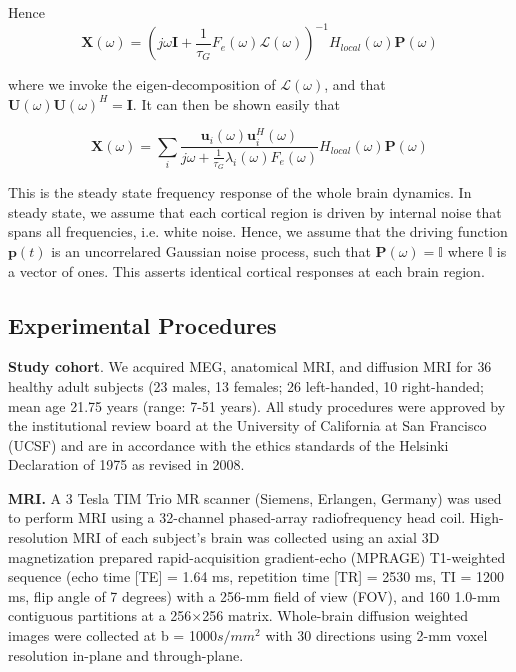Hence
\begin{equation}
\label{eq:lap_sgm}
\mathbf{X}(\omega) = (j\omega\mathbf{I} + \frac{1}{\tau_{G}} F_{e}(\omega) \mathcal{L}(\omega))^{-1} H_{local}(\omega)\mathbf{P}(\omega)
\end{equation}

where we invoke the eigen-decomposition of $\mathcal{L}(\omega)$, and
that $\mathbf{U}(\omega){\mathbf{U}(\omega)}^{H} = \mathbf{I}$. It
can then be shown easily that

\begin{equation}
\label{sgm}
\mathbf{X}(\omega) =\sum_{i}\frac{\mathbf{u}_{i}(\omega)\mathbf{u}_{i}^{H}(\omega)}{j\omega + \frac{1}{\tau_{G}}\lambda_{i}(\omega) F_{e}(\omega)} H_{local}(\omega) \mathbf{P}(\omega)
\end{equation}

This is the steady state frequency response of the whole brain dynamics.
In steady state, we assume that each cortical region is driven by
internal noise that spans all frequencies, i.e. white noise. Hence, we
assume that the driving function $\mathbf{p}(t)$ is an uncorrelared
Gaussian noise process, such that
$\mathbf{P}(\omega) = \mathbb{I}$ where $\mathbb{l}$ is a vector of
ones. This asserts identical cortical responses at each brain region.

\subsection{Experimental Procedures}
\textbf{Study cohort}. We acquired MEG, anatomical MRI, and diffusion
MRI for 36 healthy adult subjects (23 males, 13 females; 26 left-handed,
10 right-handed; mean age 21.75 years (range: 7-51 years). All study
procedures were approved by the institutional review board at the
University of California at San Francisco (UCSF) and are in accordance
with the ethics standards of the Helsinki Declaration of 1975 as revised
in 2008.

\textbf{MRI.} A 3 Tesla TIM Trio MR scanner (Siemens, Erlangen,
Germany) was used to perform MRI using a 32-channel phased-array
radiofrequency head coil. High-resolution MRI of each subject's brain
was collected using an axial 3D magnetization prepared rapid-acquisition
gradient-echo (MPRAGE) T1-weighted sequence (echo time {[}TE{]} = 1.64
ms, repetition time {[}TR{]} = 2530 ms, TI = 1200 ms, flip angle of 7
degrees) with a 256-mm field of view (FOV), and 160 1.0-mm contiguous
partitions at a 256×256 matrix. Whole-brain diffusion weighted images
were collected at b = 1000$s/mm^{2}$ with 30 directions using 2-mm
voxel resolution in-plane and through-plane.

